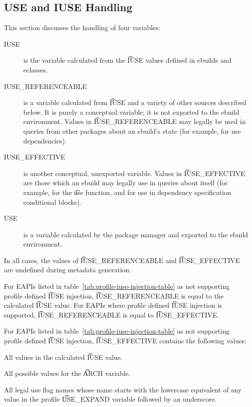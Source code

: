 \subsection{USE and IUSE Handling}
\label{sec:use-iuse-handling}

This section discusses the handling of four variables:

\begin{description}
\item[IUSE] is the variable calculated from the \t{IUSE} values defined in ebuilds and eclasses.
\item[IUSE\_REFERENCEABLE] is a variable calculated from \t{IUSE} and a variety of other sources
    described below. It is purely a conceptual variable; it is not exported to the ebuild
    environment. Values in \t{IUSE\_REFERENCEABLE} may legally be used in queries from other
    packages about an ebuild's state (for example, for use dependencies).
\item[IUSE\_EFFECTIVE] is another conceptual, unexported variable. Values in \t{IUSE\_EFFECTIVE} are
    those which an ebuild may legally use in queries about itself (for example, for the \t{use}
    function, and for use in dependency specification conditional blocks).
\item[USE] is a variable calculated by the package manager and exported to the ebuild environment.
\end{description}

In all cases, the values of \t{IUSE\_REFERENCEABLE} and \t{IUSE\_EFFECTIVE} are undefined during
metadata generation.

For EAPIs listed in table~\ref{tab:profile-iuse-injection-table} as not supporting profile defined
\t{IUSE} injection, \t{IUSE\_REFERENCEABLE} is equal to the calculated \t{IUSE} value. For EAPIs
where profile defined \t{IUSE} injection is supported, \t{IUSE\_REFERENCEABLE} is equal to
\t{IUSE\_EFFECTIVE}.

For EAPIs listed in table~\ref{tab:profile-iuse-injection-table} as not supporting profile defined
\t{IUSE} injection, \t{IUSE\_EFFECTIVE} contains the following values:

\begin{compactitem}
\item All values in the calculated \t{IUSE} value.
\item All possible values for the \t{ARCH} variable.
\item All legal use flag names whose name starts with the lowercase equivalent of any value in
    the profile \t{USE\_EXPAND} variable followed by an underscore.
\end{compactitem}

